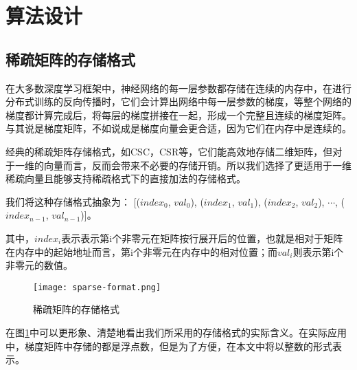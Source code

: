 \section{算法设计}
\subsection{稀疏矩阵的存储格式}
\label{subsec:sparse-format}
在大多数深度学习框架中，神经网络的每一层参数都存储在连续的内存中，在进行分布式训练的反向传播时，它们会计算出网络中每一层参数的梯度，等整个网络的梯度都计算完成后，将每层的梯度拼接在一起，形成一个完整且连续的梯度矩阵。与其说是梯度矩阵，不如说成是梯度向量会更合适，因为它们在内存中是连续的。

经典的稀疏矩阵存储格式，如CSC，CSR等，它们能高效地存储二维矩阵，但对于一维的向量而言，反而会带来不必要的存储开销。所以我们选择了更适用于一维稀疏向量且能够支持稀疏格式下的直接加法的存储格式。

我们将这种存储格式抽象为：
[($index_0$, $val_0$), ($index_1$, $val_1$), ($index_2$, $val_2$), $\cdots$, ($index_{n-1}$, $val_{n-1}$)]。

其中，$index_i$表示表示第i个非零元在矩阵按行展开后的位置，也就是相对于矩阵在内存中的起始地址而言，第i个非零元在内存中的相对位置；而$val_i$则表示第i个非零元的数值。

\begin{figure}[ht] %
  \centering
  \texttt{[image: sparse-format.png]}
  \caption{稀疏矩阵的存储格式}
  \label{fig:sparse-format}
\end{figure}

在图\ref{fig:sparse-format}中可以更形象、清楚地看出我们所采用的存储格式的实际含义。在实际应用中，梯度矩阵中存储的都是浮点数，但是为了方便，在本文中将以整数的形式表示。


